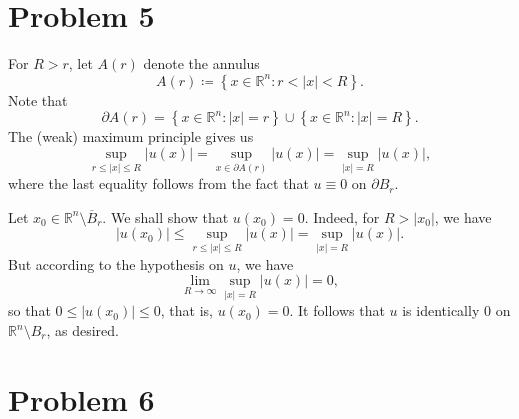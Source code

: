 \documentclass[10pt]{amsart}
\theoremstyle{thmstyle}
\theoremstyle{defstyle}
\newcommand{\R}{\mathbb{R}}
\renewcommand{\le}{\leqslant}
\begin{document}
\section{Problem 5}

For $R > r$, let $A(r)$ denote the annulus 
\begin{equation*}
    A(r) \coloneq \left\{x\in\R^n\colon r < |x| < R\right\}.
\end{equation*}
Note that 
\begin{equation*}
    \partial A(r) = \left\{x\in\R^n\colon |x| = r\right\} \cup\left\{x\in\R^n\colon |x| = R\right\}.
\end{equation*}
The (weak) maximum principle gives us 
\begin{equation*}
    \sup_{r\le |x|\le R} |u(x)| = \sup_{x\in\partial A(r)}|u(x)| = \sup_{|x| = R} |u(x)|,
\end{equation*}
where the last equality follows from the fact that $u\equiv 0$ on $\partial B_r$. 

Let $x_0\in\R^n\setminus\overline B_r$. We shall show that $u(x_0) = 0$. Indeed, for $R > |x_0|$, we have 
\begin{equation*}
    |u(x_0)|\le\sup_{r\le |x|\le R} |u(x)| = \sup_{|x| = R} |u(x)|.
\end{equation*}
But according to the hypothesis on $u$, we have 
\begin{equation*}
    \lim_{R\to\infty}\sup_{|x| = R} |u(x)| = 0,
\end{equation*}
so that $0\le |u(x_0)|\le 0$, that is, $u(x_0) = 0$. It follows that $u$ is identically $0$ on $\R^n\setminus B_r$, as desired.

\section{Problem 6}
\end{document}
